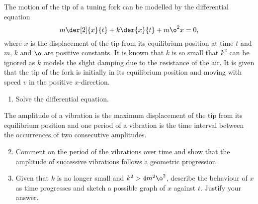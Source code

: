\begin{problem}
    The motion of the tip of a tuning fork can be modelled by the differential equation \[m \der[2]{x}{t} + k \der{x}{t} + m \o^2 x = 0,\] where $x$ is the displacement of the tip from its equilibrium position at time $t$ and $m$, $k$ and $\o$ are positive constants. It is known that $k$ is so small that $k^2$ can be ignored as $k$ models the slight damping due to the resistance of the air. It is given that the tip of the fork is initially in its equilibrium position and moving with speed $v$ in the positive $x$-direction.

    \begin{enumerate}
        \item Solve the differential equation.
    \end{enumerate}

    The amplitude of a vibration is the maximum displacement of the tip from its equilibrium position and one period of a vibration is the time interval between the occurrences of two consecutive amplitudes.

    \begin{enumerate}
        \setcounter{enumi}{1}
        \item Comment on the period of the vibrations over time and show that the amplitude of successive vibrations follows a geometric progression.
        \item Given that $k$ is no longer small and $k^2 > 4m^2 \o^2$, describe the behaviour of $x$ as time progresses and sketch a possible graph of $x$ against $t$. Justify your answer.
    \end{enumerate}
\end{problem}